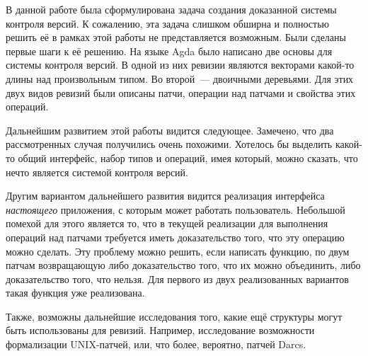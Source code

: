 \startconclusionpage

В данной работе была сформулирована задача создания доказанной системы
контроля версий. К сожалению, эта задача слишком обширна и полностью
решить её в рамках этой работы не представляется возможным. Были
сделаны первые шаги к её решению. На языке Agda было написано две
основы для системы контроля версий. В одной из них ревизии являются
векторами какой-то длины над произвольным типом. Во второй~---
двоичными деревьями. Для этих двух видов ревизий были описаны патчи,
операции над патчами и свойства этих операций. 

Дальнейшим развитием этой работы видится следующее. Замечено, что два
рассмотренных случая получились очень похожими. Хотелось бы выделить
какой-то общий интерфейс, набор типов и операций, имея который, можно
сказать, что нечто является системой контроля версий. 

Другим вариантом дальнейшего развития видится реализация интерфейса
\emph{настоящего} приложения, с которым может работать пользователь.
Небольшой помехой для этого является то, что в текущей реализации для
выполнения операций над патчами требуется иметь доказательство того,
что эту операцию можно сделать. Эту проблему можно решить, если
написать функцию, по двум патчам возвращающую либо доказательство
того, что их можно объединить, либо доказательство того, что нельзя.
Для первого из двух реализованных вариантов такая функция уже
реализована. %

Также, возможны дальнейшие исследования того, какие ещё структуры
могут быть использованы для ревизий. Например, исследование
возможности формализации UNIX-патчей, или, что более, вероятно, патчей
Darcs.